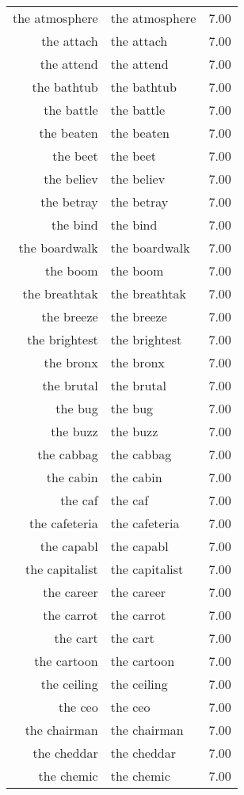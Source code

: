 \begin{table}[ht]
\begin{tabular}{rlr}
  the atmosphere & the atmosphere & 7.00 \\ 
  the attach & the attach & 7.00 \\ 
  the attend & the attend & 7.00 \\ 
  the bathtub & the bathtub & 7.00 \\ 
  the battle & the battle & 7.00 \\ 
  the beaten & the beaten & 7.00 \\ 
  the beet & the beet & 7.00 \\ 
  the believ & the believ & 7.00 \\ 
  the betray & the betray & 7.00 \\ 
  the bind & the bind & 7.00 \\ 
  the boardwalk & the boardwalk & 7.00 \\ 
  the boom & the boom & 7.00 \\ 
  the breathtak & the breathtak & 7.00 \\ 
  the breeze & the breeze & 7.00 \\ 
  the brightest & the brightest & 7.00 \\ 
  the bronx & the bronx & 7.00 \\ 
  the brutal & the brutal & 7.00 \\ 
  the bug & the bug & 7.00 \\ 
  the buzz & the buzz & 7.00 \\ 
  the cabbag & the cabbag & 7.00 \\ 
  the cabin & the cabin & 7.00 \\ 
  the caf & the caf & 7.00 \\ 
  the cafeteria & the cafeteria & 7.00 \\ 
  the capabl & the capabl & 7.00 \\ 
  the capitalist & the capitalist & 7.00 \\ 
  the career & the career & 7.00 \\ 
  the carrot & the carrot & 7.00 \\ 
  the cart & the cart & 7.00 \\ 
  the cartoon & the cartoon & 7.00 \\ 
  the ceiling & the ceiling & 7.00 \\ 
  the ceo & the ceo & 7.00 \\ 
  the chairman & the chairman & 7.00 \\ 
  the cheddar & the cheddar & 7.00 \\ 
  the chemic & the chemic & 7.00 \\ 

\end{tabular}
\end{table}

